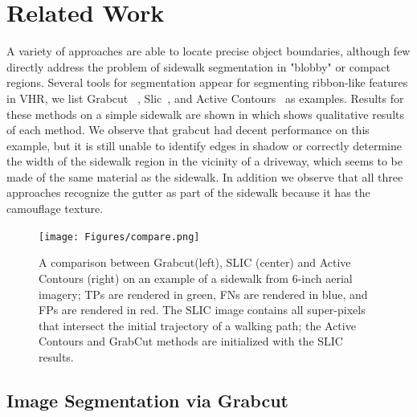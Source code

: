 \chapter{Related Work}

A variety of approaches are able to locate precise object boundaries, although few directly address the problem of sidewalk segmentation in "blobby" or compact regions. 
Several tools for segmentation appear for segmenting ribbon-like features in \ac{VHR}, we list Grabcut ~\cite{Rother2004-ou}, Slic~\cite{Achanta:149300}, and Active Contours~\cite{Kass88snakes:active} as examples.
Results for these methods on a simple sidewalk are shown in  which shows qualitative results of each method. 
We observe that grabcut had decent performance on this example, but it is still unable to identify edges in shadow or correctly determine the width of the sidewalk region in the vicinity of a driveway, which seems to be made of the same material as the sidewalk. 
In addition we observe that all three approaches recognize the gutter as part of the sidewalk because it has the camouflage texture.

\begin{figure}[H]
    \centering
    \texttt{[image: Figures/compare.png]}
    \caption[Method comparison with Grabcut, Active Contours, and Slic]{
        A comparison between Grabcut(left), SLIC (center) and Active Contours (right) 
        on an example of a sidewalk from 6-inch aerial imagery; 
        \aclp{TP} are rendered in green, 
        \aclp{FN} are rendered in blue, and 
        \aclp{FP} are rendered in red.
        The SLIC image contains all super-pixels that intersect the initial trajectory of a walking path; the Active Contours and GrabCut methods are initialized with the SLIC results.
    }
    \label{fig:Method_comparison}
\end{figure}

\section{Image Segmentation via Grabcut} 


